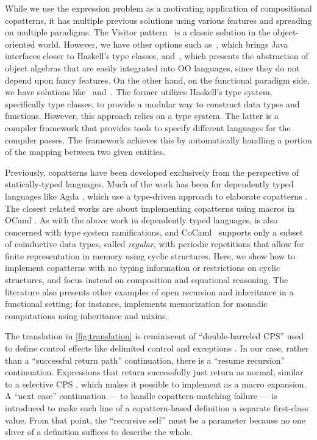 While we use the expression problem as a motivating application of compositional copatterns, it has multiple previous solutions using various features and spreading on multiple paradigms.
The Visitor pattern~\cite{GangOfFour} is a classic solution in the object-oriented world.
However, we have other options such as~\cite{wehr_javagi_2011}, which brings Java interfaces closer to Haskell's type classes, and~\cite{hutchison_extensibility_2012}, which presents the abstraction of object algebras that are easily integrated into OO languages, since they do not depend upon fancy features.
On the other hand, on the functional paradigm side, we have solutions like~\cite{swierstra_data_2008} and~\cite{keep_nanopass_2013}.
The former utilizes Haskell's type system, specifically type classes, to provide a modular way to construct data types and functions.
However, this approach relies on a type system.
The latter is a compiler framework that provides tools to specify different languages for the compiler passes. The framework achieves this by automatically handling a portion of the mapping between two given entities.

Previously, copatterns have been developed exclusively from the perspective of statically-typed languages.
Much of the work has been for dependently typed languages like Agda \cite{ElaboratingDependentCopatterns}, which use a type-driven approach to elaborate copatterns \cite{UnnestingCopatterns,ThibodeauMasters}.
The closest related works are about implementing copatterns using macros in OCaml \cite{LaforgueR17,jeannin_cocaml_2017}.
As with the above work in dependently typed languages, \cite{LaforgueR17} is also concerned with type system ramifications, and
CoCaml~\cite{jeannin_cocaml_2017} supports only a subset of coinductive data types, called \emph{regular}, with periodic repetitions that allow for finite representation in memory using cyclic structures.
Here, we show how to implement copatterns with no typing information or restrictions on cyclic structures, and focus instead on composition and equational reasoning.
The literature also presents other examples of open recursion and inheritance in a functional setting; for instance, \cite{Brown2009FunctionI} implements memorization for monadic computations using inheritance and mixins.

The translation in \cref{fig:translation} is reminiscent of ``double-barreled CPS'' \cite{DoubleBarrelCPS} used to define control effects like delimited control \cite{AbstractingControl} and exceptions \cite{KimYiDanvy98}.
In our case, rather than a ``successful return path'' continuation, there is a ``resume recursion'' continuation.
Expressions that return successfully just return as normal, similar to a selective CPS \cite{SelectiveCPS}, which makes it possible to implement as a macro expansion.
A ``next case'' continuation --- to handle copattern-matching failure --- is introduced to make each line of a copattern-based definition a separate first-class value.
From that point, the ``recursive self'' must be a parameter because no one sliver of a definition suffices to describe the whole.

